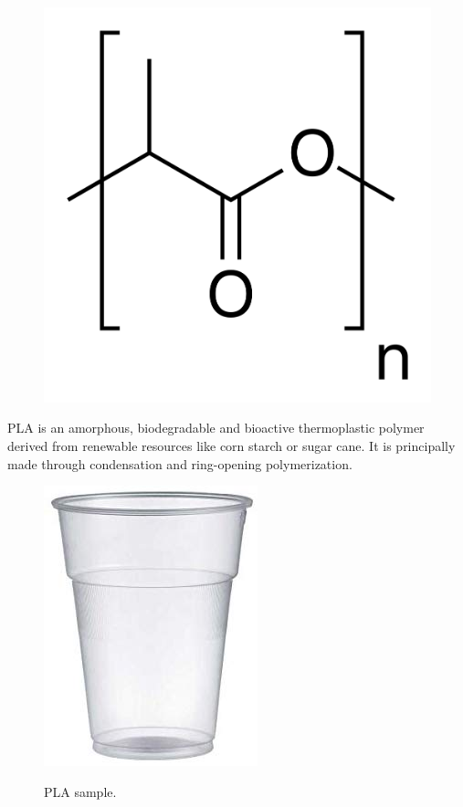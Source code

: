 \documentclass[a4paper, 11pt]{article}
\begin{document}
\begin{figure}[htp]
	\centering
	{\includegraphics[scale=0.3]{pla_chem}}
	\captionsetup{justification=centering}
	\label{fig:PE}
\end{figure}
PLA is an amorphous, biodegradable and bioactive thermoplastic polymer derived from renewable resources like corn starch or sugar cane. It is principally made through condensation and ring-opening polymerization.

\begin{figure}[h!]
	\centering
	{\includegraphics[scale=0.18]{PLA}}
	\captionsetup{justification=centering}
	\caption{PLA sample.}
	\label{fig:PLA}
\end{figure}
 
\end{document}
